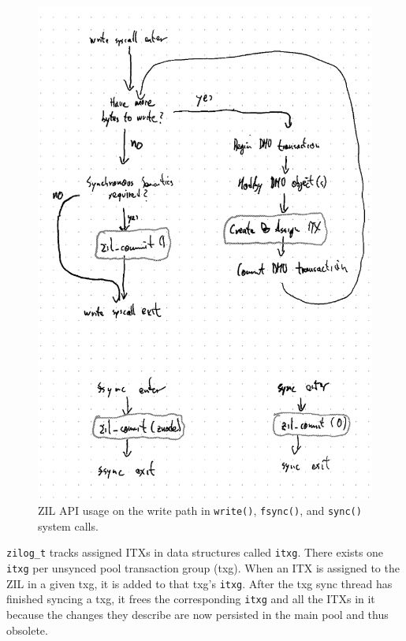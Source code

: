 \documentclass[12pt,a4paper,twoside]{book}
\begin{document}
\begin{figure}[h]
    \includegraphics[height=0.8\textheight]{fig/zil_api_syscall_activity_diagram}
    \caption{
        ZIL API usage on the write path in \lstinline{write()}, \lstinline{fsync()}, and \lstinline{sync()} system calls.
    }
    \label{fig:zil_api_syscall_activity_diagrams}
\end{figure}

\lstinline{zilog_t} tracks assigned ITXs in data structures called \lstinline{itxg}.
There exists one \lstinline{itxg} per unsynced pool transaction group (txg).
When an ITX is assigned to the ZIL in a given txg, it is added to that txg's \lstinline{itxg}.
After the txg sync thread has finished syncing a txg, it frees the corresponding \lstinline{itxg} and all the ITXs in it because the changes they describe are now persisted in the main pool and thus obsolete.
\end{document}
